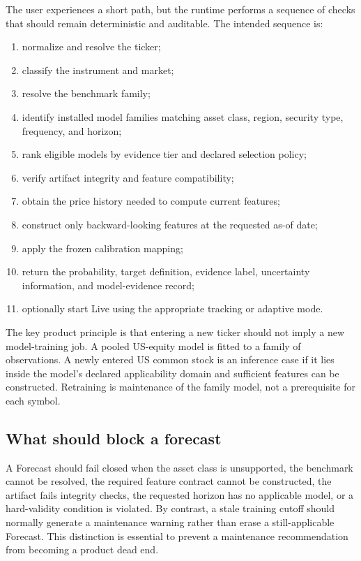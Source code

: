 \documentclass[11pt]{article}
\begin{document}
The user experiences a short path, but the runtime performs a sequence of checks that should remain deterministic and auditable. The intended sequence is:
\begin{enumerate}[itemsep=0.25em]
\item normalize and resolve the ticker;
\item classify the instrument and market;
\item resolve the benchmark family;
\item identify installed model families matching asset class, region, security type, frequency, and horizon;
\item rank eligible models by evidence tier and declared selection policy;
\item verify artifact integrity and feature compatibility;
\item obtain the price history needed to compute current features;
\item construct only backward-looking features at the requested as-of date;
\item apply the frozen calibration mapping;
\item return the probability, target definition, evidence label, uncertainty information, and model-evidence record;
\item optionally start Live using the appropriate tracking or adaptive mode.
\end{enumerate}

The key product principle is that entering a new ticker should not imply a new model-training job. A pooled US-equity model is fitted to a family of observations. A newly entered US common stock is an inference case if it lies inside the model's declared applicability domain and sufficient features can be constructed. Retraining is maintenance of the family model, not a prerequisite for each symbol.

\subsection{What should block a forecast}
A Forecast should fail closed when the asset class is unsupported, the benchmark cannot be resolved, the required feature contract cannot be constructed, the artifact fails integrity checks, the requested horizon has no applicable model, or a hard-validity condition is violated. By contrast, a stale training cutoff should normally generate a maintenance warning rather than erase a still-applicable Forecast. This distinction is essential to prevent a maintenance recommendation from becoming a product dead end.
\end{document}

